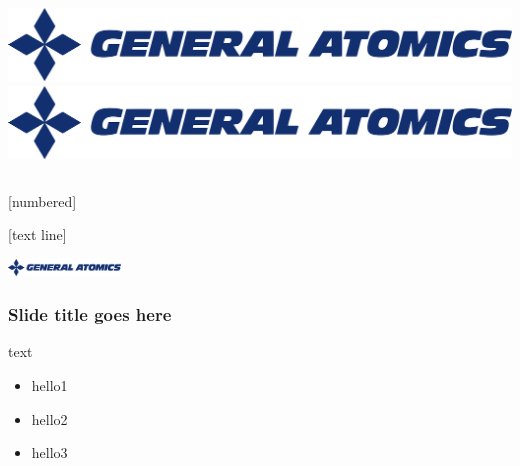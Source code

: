 \documentclass[10pt,mathserif,xcolor={table,dvipsnames},aspectratio=169]{beamer}
\begin{document}
\begin{frame}
\begin{columns}
\begin{column}{0.5\textwidth}
\begin{minipage}[t][5.2cm][t]{\textwidth}
            \includegraphics[width=\textwidth]{../figures/General-Atomics.pdf}\\
            \includegraphics[width=\textwidth]{../figures/General-Atomics.pdf}
        \end{minipage}
    \end{column}
  \end{columns}
\end{frame}

\addtocounter{framenumber}{-1}


[numbered]

[text line]{
  \parbox{\linewidth}{\vspace*{-15pt}
        \includegraphics[width=3.0cm]{../figures/General-Atomics.pdf}
        \hfill \textcolor{Black}{}
        \hfill \hspace{2cm} \insertpagenumber}}

\begin{frame}[t]
\frametitle{Slide title goes here}
text
\begin{itemize}
    \item{hello1}
    \item{hello2}
    \item{hello3}
\end{itemize}
\end{frame}
\end{document}
